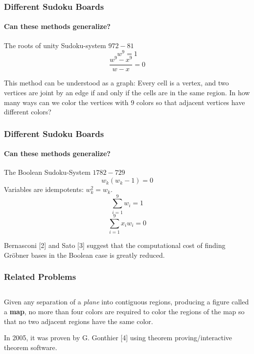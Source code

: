 \documentclass{beamer}
\begin{document}
\begin{frame}
\frametitle{Different Sudoku Boards}
\framesubtitle{Can these methods generalize?}
\begin{alertblock}{The roots of unity Sudoku-system $972-81$}
\[w^9 = 1 \]
\[\frac{w^9-x^9}{w-x} = 0\]
\end{alertblock}
This method can be understood as a graph: Every cell is a vertex, and two vertices are joint by an edge if and only if the cells are in the same region. In how many ways can we color the vertices with 9 colors so that adjacent vertices have different colors?
\end{frame}

\begin{frame}
\frametitle{Different Sudoku Boards}
\framesubtitle{Can these methods generalize?}
\begin{alertblock}{The Boolean Sudoku-System $1782-729$}
\[w_k(w_k-1) = 0\]
Variables are idempotents: $w_k^2 = w_k$.
\[\sum_{i=1}^9 w_i = 1\]
\[\sum_{i=1}^9 x_iw_i = 0\]
\end{alertblock}

Bernasconi [2] and Sato [3] suggest that the computational cost of finding Gr\" obner bases in the Boolean case is greatly reduced. 
\end{frame}






\begin{frame}
\frametitle{Related Problems}
\[\]
\begin{Theorem}
Given any separation of a \textit{plane} into contiguous regions, producing a figure called a \textbf{map}, no more than four colors are required to color the regions of the map so that no two adjacent regions have the same color.
\end{Theorem}
\[\]
In 2005, it was proven by G. Gonthier [4] using theorem proving/interactive theorem software.\\
\end{frame}
\end{document}
